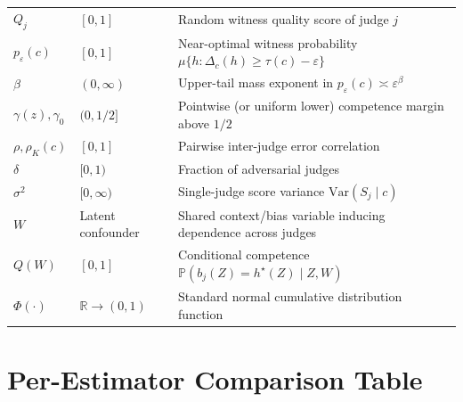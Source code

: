 \documentclass[11pt]{article}
\newcommand{\Prob}{\mathbb{P}}
\newcommand{\Var}{\mathrm{Var}}
\newcommand{\R}{\mathbb{R}}
\begin{document}
{\begin{longtable}{@{}>{\raggedright\arraybackslash}p{2.3cm}>{\raggedright\arraybackslash}p{3.0cm}>{\raggedright\arraybackslash}p{9.2cm}@{}}
$Q_j$ & $[0,1]$ & Random witness quality score of judge $j$ \\
$p_\varepsilon(c)$ & $[0,1]$ & Near-optimal witness probability $\mu\{h : \Delta_c(h) \ge \tau(c) - \varepsilon\}$ \\
$\beta$ & $(0, \infty)$ & Upper-tail mass exponent in $p_\varepsilon(c) \asymp \varepsilon^\beta$ \\
$\gamma(z), \gamma_0$ & $(0, 1/2]$ & Pointwise (or uniform lower) competence margin above $1/2$ \\
$\rho, \rho_K(c)$ & $[0, 1]$ & Pairwise inter-judge error correlation \\
$\delta$ & $[0, 1)$ & Fraction of adversarial judges \\
$\sigma^2$ & $[0, \infty)$ & Single-judge score variance $\Var(S_j \mid c)$ \\
$W$ & Latent confounder & Shared context/bias variable inducing dependence across judges \\
$Q(W)$ & $[0,1]$ & Conditional competence $\Prob(b_j(Z) = h^\star(Z) \mid Z, W)$ \\
$\Phi(\cdot)$ & $\R \to (0,1)$ & Standard normal cumulative distribution function \\
\bottomrule
\end{longtable}
}

\section{Per-Estimator Comparison Table}
\label{sec:per_estimator}
\end{document}
